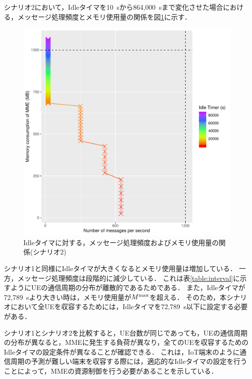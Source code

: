 \documentclass[technicalreport]{ieicej-rev}
\begin{document}
シナリオ2において，Idleタイマを10~sから864,000~sまで変化させた場合における，メッセージ処理頻度とメモリ使用量の関係を図\ref{theory_2_all_300s_theory}に示す．
\begin{figure}[!t]
  \centering
  \includegraphics[width=1\hsize]{theory_2_all_300s_theory.pdf}
  \caption{Idleタイマに対する，メッセージ処理頻度およびメモリ使用量の関係(シナリオ2)}
  \label{theory_2_all_300s_theory}
\end{figure}
シナリオ1と同様にIdleタイマが大きくなるとメモリ使用量は増加している．
一方，メッセージ処理頻度は段階的に減少している．
これは表\ref{table:interval}に示すようにUEの通信周期の分布が離散的であるためである．
また，Idleタイマが72,789~sより大きい時は，メモリ使用量が$M^{\rm max}$を超える．
そのため，本シナリオにおいて全UEを収容するためには，Idleタイマを72,789~s以下に設定する必要がある．

シナリオ1とシナリオ2を比較すると，UE台数が同じであっても，UEの通信周期の分布が異なると，MMEに発生する負荷が異なり，全てのUEを収容するためのIdleタイマの設定条件が異なることが確認できる．
これは，IoT端末のように通信周期の予測が難しい端末を収容する際には，適応的なIdleタイマの設定を行うことによって，MMEの資源制御を行う必要があることを示している．
\end{document}

